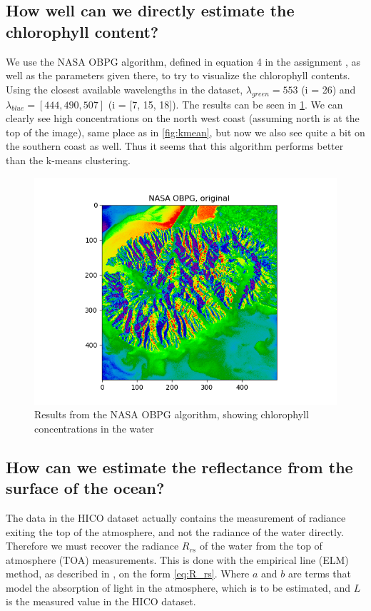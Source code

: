 \subsection{How well can we directly estimate the chlorophyll content?}

We use the NASA OBPG algorithm, defined in equation 4 in the assignment 
\cite{assignment}, as well as the parameters given there, to try to 
visualize the chlorophyll contents. Using the closest available wavelengths 
in the dataset, $\lambda_{green} = 553$ (i = 26) and $\lambda_{blue} = [444, 490, 507]$ 
(i = [7, 15, 18]). The results can be seen in \cref{fig:obpg}. We can clearly 
see high concentrations on the north west coast (assuming north is at the 
top of the image), same place as in \cref{fig:kmean}, but now we also see 
quite a bit on the southern coast as well. Thus it seems that this 
algorithm performs better than the k-means clustering. 

\begin{figure}
    \centering
    \includegraphics[width=\textwidth]{../fig/NASA OBPG, original.png}
    \caption{Results from the NASA OBPG algorithm, showing chlorophyll concentrations 
    in the water}
    \label{fig:obpg}
\end{figure}

\subsection{How can we estimate the reflectance from the surface of the ocean?}
\label{sec:atmoshperic_cor}

The data in the HICO dataset actually contains the measurement of radiance exiting the top 
of the atmosphere, and not the radiance of the water directly. Therefore we must recover the 
radiance $R_{rs}$ of the water from the top of atmosphere (TOA) measurements. This is done with 
the empirical line (ELM) method, as described in \cite{assignment}, on the form \cref{eq:R_rs}. 
Where $a$ and $b$ are terms that model the absorption of light in the atmosphere, which is to 
be estimated, and $L$ is the measured value in the HICO dataset. 

